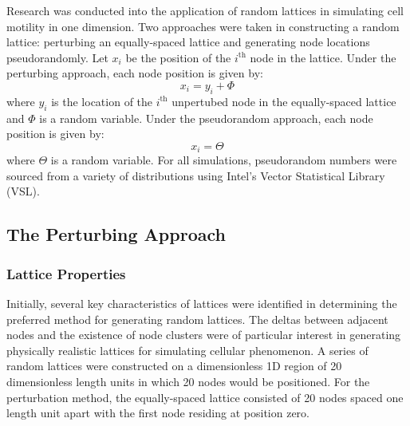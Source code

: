 \documentclass[11pt,titlepage,a4paper]{article}
\begin{document}
	Research was conducted into the application of random lattices in simulating cell motility in one dimension. Two approaches were taken in constructing a random lattice: perturbing an equally-spaced lattice and generating node locations pseudorandomly. Let $x_i$ be the position of the $i^\text{th}$ node in the lattice. Under the perturbing approach, each node position is given by:
	\begin{equation*}
		x_i = y_i + \Phi
	\end{equation*}
	where $y_i$ is the location of the $i^{\text{th}}$ unpertubed node in the equally-spaced lattice and $\Phi$ is a random variable. Under the pseudorandom approach, each node position is given by:
	\begin{equation*}
		x_i = \Theta
	\end{equation*}
	where $\Theta$ is a random variable. For all simulations, pseudorandom numbers were sourced from a variety of distributions using Intel's Vector Statistical Library (VSL).

	\subsection{The Perturbing Approach}
		\label{sub:theperturbingapproach}
		
		\subsubsection{Lattice Properties}
		\label{sub:latticeproperties_perturbed}
			
			Initially, several key characteristics of lattices were identified in determining the preferred method for generating random lattices. The deltas between adjacent nodes and the existence of node clusters were of particular interest in generating physically realistic lattices for simulating cellular phenomenon. A series of random lattices were constructed on a dimensionless 1D region of 20 dimensionless length units in which 20 nodes would be positioned. For the perturbation method, the equally-spaced lattice consisted of 20 nodes spaced one length unit apart with the first node residing at position zero. 
\end{document}
